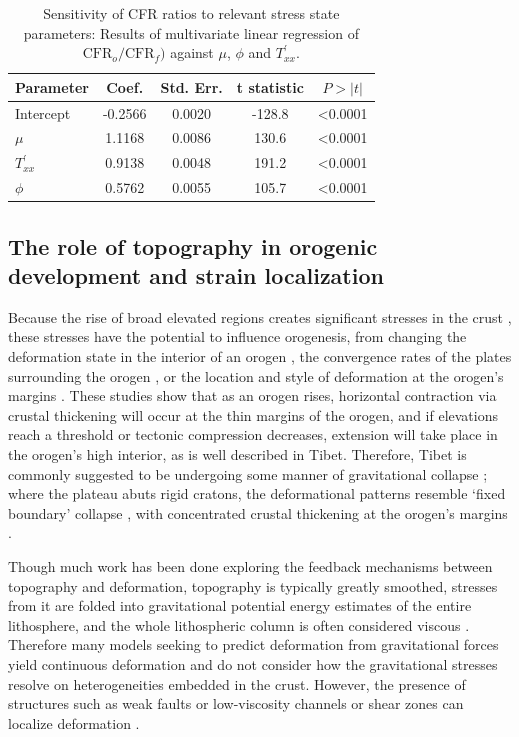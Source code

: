 \documentclass[twocolumn,jgrga]{AGUTeX}
\begin{document}
\begin{article}
\begin{table}[htb]
\centering
\begin{tabular}{l c c c c}
\hline
Parameter & Coef. & Std. Err. & t statistic & $P>|t|$ \\
\hline
Intercept & -0.2566 & 0.0020 & -128.8 & \textless{}0.0001 \\ 
$\mu$ & 1.1168 & 0.0086 & 130.6 & \textless{}0.0001 \\ 
$T^\prime_{xx}$ & 0.9138 & 0.0048 & 191.2 & \textless{}0.0001 \\ 
$\phi$ & 0.5762 & 0.0055 & 105.7 & \textless{}0.0001 \\ 
\hline
\end{tabular}
\caption{Sensitivity of CFR ratios to relevant stress state parameters:
Results of multivariate linear regression of
$\mathrm{CFR}_o/ \mathrm{CFR}_f)$ against $\mu$, $\phi$ and
$T^\prime_{xx}$.}
\label{table:cfr_regress}
\end{table}

\subsection{The role of topography in orogenic development and strain
localization}\label{the-role-of-topography-in-orogenic-development-and-strain-localization}

Because the rise of broad elevated regions creates significant stresses
in the crust \citep[e.g.,][]{jeffreys1924}, these stresses have the
potential to influence orogenesis, from changing the deformation state
in the interior of an orogen \citep[e.g.,][]{dewey1988, molnar1988}, the
convergence rates of the plates surrounding the orogen \citep[e.g.][]
{meade2008}, or the location and style of deformation at the orogen's
margins \citep[e.g.,][]{beaumont2001, decelles2009}. These studies show that
as an orogen rises, horizontal contraction via crustal thickening will
occur at the thin margins of the orogen, and if elevations reach a
threshold or tectonic compression decreases, extension will take place
in the orogen's high interior, as is well described in Tibet. Therefore,
Tibet is commonly suggested to be undergoing some manner of
gravitational collapse \citep[e.g.,][]{england1989}; where the plateau abuts
rigid cratons, the deformational patterns resemble `fixed boundary'
collapse \citep{rey2001}, with concentrated crustal thickening at the
orogen's margins \citep[e.g.,][]{cook2008}.

Though much work has been done exploring the feedback mechanisms between
topography and deformation, topography is typically greatly smoothed,
stresses from it are folded into gravitational potential energy
estimates of the entire lithosphere, and the whole lithospheric column
is often considered viscous \citep{copleymckenzie2007}. Therefore many
models seeking to predict deformation from gravitational forces yield
continuous deformation and do not consider how the gravitational
stresses resolve on heterogeneities embedded in the crust. However, the
presence of structures such as weak faults \citep{bird1994} or
low-viscosity channels or shear zones \citep[e.g.,][]{clark2005} can localize
deformation \citep[e.g.,][]{bird1994, fleschbendick2012}.


\end{article}
\end{document}
